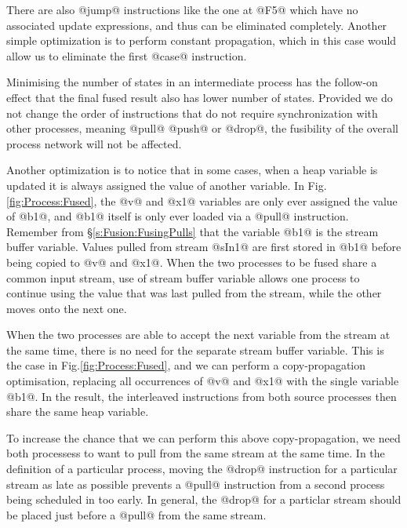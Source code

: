 There are also @jump@ instructions like the one at @F5@ which have no associated update expressions, and thus can be eliminated completely. Another simple optimization is to perform constant propagation, which in this case would allow us to eliminate the first @case@ instruction. 

Minimising the number of states in an intermediate process has the follow-on effect that the final fused result also has lower number of states. Provided we do not change the order of instructions that do not require synchronization with other processes, meaning @pull@ @push@ or @drop@, the fusibility of the overall process network will not be affected.

Another optimization is to notice that in some cases, when a heap variable is updated it is always assigned the value of another variable. In Fig.\ref{fig:Process:Fused}, the @v@ and @x1@ variables are only ever assigned the value of @b1@, and @b1@ itself is only ever loaded via a @pull@ instruction. Remember from \S\ref{s:Fusion:FusingPulls} that the variable @b1@ is the stream buffer variable. Values pulled from stream @sIn1@ are first stored in @b1@ before being copied to @v@ and @x1@. When the two processes to be fused share a common input stream, use of stream buffer variable allows one process to continue using the value that was last pulled from the stream, while the other moves onto the next one. 

When the two processes are able to accept the next variable from the stream at the same time, there is no need for the separate stream buffer variable. This is the case in Fig.\ref{fig:Process:Fused}, and we can perform a copy-propagation optimisation, replacing all occurrences of @v@ and @x1@ with the single variable @b1@. In the result, the interleaved instructions from both source processes then share the same heap variable.

To increase the chance that we can perform this above copy-propagation, we need both processess to want to pull from the same stream at the same time. In the definition of a particular process, moving the @drop@ instruction for a particular stream as late as possible prevents a @pull@ instruction from a second process being scheduled in too early. In general, the @drop@ for a particlar stream should be placed just before a @pull@ from the same stream. 





